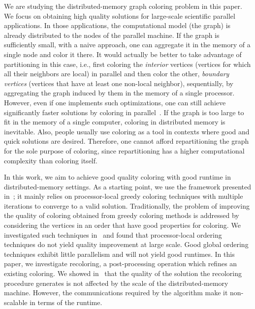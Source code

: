 \documentclass{article}
\begin{document}
We are studying the distributed-memory graph coloring problem in this paper.
We focus on obtaining high quality solutions for large-scale scientific parallel
applications. In those applications, the computational model (the graph)
is already distributed to the nodes of the parallel machine. 
If the graph is sufficiently small, with a naive approach, one can aggregate it in the
memory of a single node and color it there. It would actually be better to take
advantage of partitioning in this case, i.e., first coloring the {\em interior}
vertices (vertices for which all their neighbors are local) in parallel and
then color the other, {\em boundary vertices}
(vertices that have at least one non-local neighbor), sequentially, by aggregating
the graph induced by them in the memory of a single processor. 
However, even if one implements such optimizations, one can still
achieve significantly faster solutions by coloring in parallel~\cite{BGMBC-jpdc}.
If the graph is too large to fit in the memory of a single computer,
coloring in distributed memory is inevitable. Also, people
usually use coloring as a tool in contexts where good and quick solutions are desired.
Therefore, one cannot afford repartitioning the graph for the sole purpose of coloring, since
repartitioning has a higher computational complexity than coloring
itself.


In this work, we aim to achieve good quality coloring with good
runtime in distributed-memory settings. As a starting point, we
use the framework presented in~\cite{BGMBC-jpdc}; it mainly relies on
processor-local greedy coloring techniques with multiple iterations to
converge to a valid solution. Traditionally, the problem of improving
the quality of coloring obtained from greedy coloring methods is
addressed by considering the vertices in an order that have good properties for
coloring.  We investigated such techniques in~\cite{HiPC11} and found
that processor-local ordering techniques do not yield quality
improvement at large scale. Good global ordering techniques
exhibit little parallelism and will not yield good runtimes.  In this
paper, we investigate recoloring, a post-processing operation which
refines an existing coloring. We showed in~\cite{HiPC11} that the quality of the
solution the recoloring procedure generates is not affected by the
scale of the distributed-memory machine. However, the communications
required by the algorithm make it non-scalable in terms of the runtime.
\end{document}
